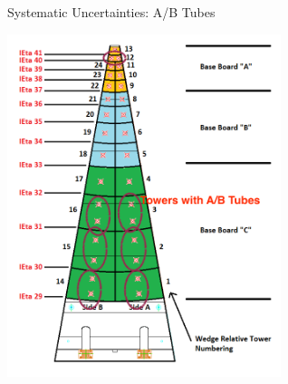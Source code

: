 \documentclass[pdf, 9pt]{beamer}
\begin{document}
  \begin{frame}{Systematic Uncertainties: A/B Tubes}
  \begin{center}
    \includegraphics[width=0.6\textwidth, height=0.8\textheight]{figs/sourcing/HFWedge.png}
  \end{center}
  \end{frame}
\end{document}
